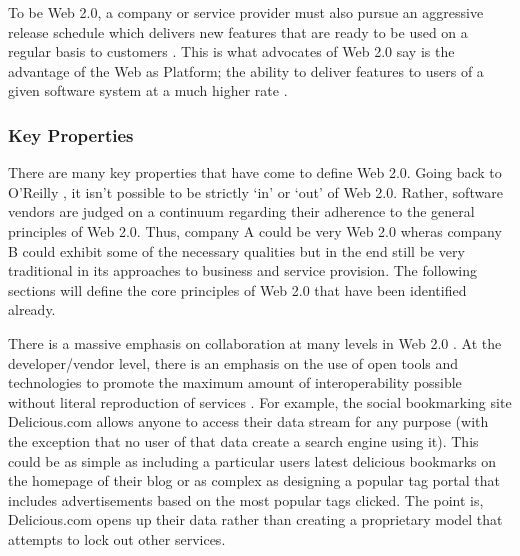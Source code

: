 \documentclass[12pt,oneside,letterpaper,titlepage]{article}
\begin{document}
To be Web 2.0, a company or service provider must also pursue an aggressive
release schedule which delivers new features that are ready to be used on a
regular basis to customers \citep{miller2005}.  This is what advocates of Web
2.0 say is the advantage of the Web as Platform; the ability to deliver features
to users of a given software system at a much higher rate \citep{oreilly2007}.

\subsubsection{Key Properties}

There are many key properties that have come to define Web 2.0.  Going back to
O'Reilly \citeyearpar{oreilly2007}, it isn't possible to be strictly `in' or
`out' of Web 2.0.  Rather, software vendors are judged on a continuum regarding
their adherence to the general principles of Web 2.0.  Thus, company A could be
very Web 2.0 wheras company B could exhibit some of the necessary qualities but
in the end still be very traditional in its approaches to business and service
provision.  The following sections will define the core principles of Web 2.0
that have been identified already.

There is a massive emphasis on collaboration at many levels in Web 2.0
\citep{oreilly2007}.  At the developer/vendor level, there is an emphasis on the
use of open tools and technologies to promote the maximum amount of
interoperability possible without literal reproduction of services
\citep{miller2005}.  For example, the social bookmarking site Delicious.com
allows anyone to access their data stream for any purpose (with the exception
that no user of that data create a search engine using it).  This could be as
simple as including a particular users latest delicious bookmarks on the
homepage of their blog or as complex as designing a popular tag portal that
includes advertisements based on the most popular tags clicked.  The point is,
Delicious.com opens up their data rather than creating a proprietary model that
attempts to lock out other services.
\end{document}
